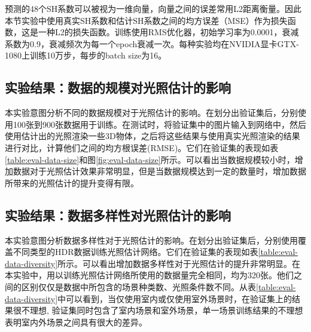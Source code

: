 预测的48个SH系数可以被视为一维向量，向量之间的误差常用L2距离衡量。因此本节实验中使用真实SH系数和估计SH系数之间的均方误差（MSE）作为损失函数，这是一种L2的损失函数。训练使用RMS优化器\cite{tieleman2012lecture}，初始学习率为0.0001，衰减系数为0.9，衰减频次为每一个epoch衰减一次。每种实验均在NVIDIA显卡GTX-1080上训练10万步，每步的batch size为16。
\subsection{实验结果：数据的规模对光照估计的影响}


本实验意图分析不同的数据规模对于光照估计的影响。在划分出验证集后，分别使用100张到900张数据用于训练。在测试时，将验证集中的图片输入到网络中，然后使用估计出的光照渲染一些3D物体，之后将这些结果与使用真实光照渲染的结果进行对比，计算他们之间的均方根误差(RMSE)。它们在验证集的表现如表\ref{table:eval-data-size}和图\ref{fig:eval-data-size}所示。可以看出当数据规模较小时，增加数据对于光照估计效果非常明显，但是当数据规模达到一定的数量时，增加数据所带来的光照估计的提升变得有限。
\subsection{实验结果：数据多样性对光照估计的影响}

本实验意图分析数据多样性对于光照估计的影响。在划分出验证集后，分别使用覆盖不同类型的HDR数据训练光照估计网络。它们在验证集的表现如表\ref{table:eval-data-diversity}所示。可以看出增加数据多样性对于光照估计的提升非常明显。在本实验中，用以训练光照估计网络所使用的数据量完全相同，均为320张。他们之间的区别仅仅是数据中所包含的场景种类数、光照条件数不同。从表\ref{table:eval-data-diversity}中可以看到，当仅使用室内或仅使用室外场景时，在验证集上的结果很不理想, 验证集同时包含了室内场景和室外场景，单一场景训练结果的不理想表明室内外场景之间具有很大的差异。
